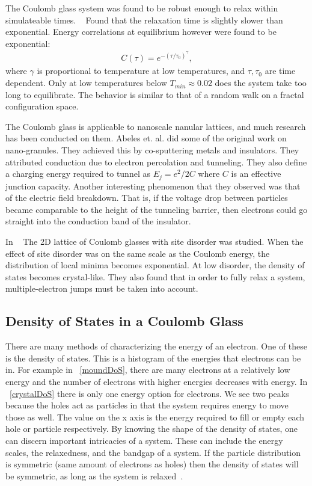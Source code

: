 The Coulomb glass system was found to be robust enough to relax within simulateable times. ~\cite{Kirkengen09} Found that the relaxation time is slightly slower than exponential. Energy correlations at equilibrium however were found to be exponential:
\begin{eqnarray}
C(\tau) = e^{-(\tau / \tau_0)^\gamma},
\label{correlations}
\end{eqnarray}
where $\gamma$ is proportional to temperature at low temperatures, and $\tau , \tau_0$ are time dependent. Only at low temperatures below $T_{min} \approx 0.02$ does the system take too long to equilibrate. The behavior is similar to that of a random walk on a fractal configuration space. 

The Coulomb glass is applicable to nanoscale nanular lattices, and much research has been conducted on them. Abeles et. al. did some of the original work on nano-granules. They achieved this by co-sputtering metals and insulators. They attributed conduction due to electron percolation and tunneling. They also define a charging energy required to tunnel as $E_j = e^2/2C$ where $C$ is an effective junction capacity. Another interesting phenomenon that they observed was that of the electric field breakdown. That is, if the voltage drop between particles became comparable to the height of the tunneling barrier, then electrons could go straight into the conduction band of the insulator. 

In ~\cite{Vinokur08} The 2D lattice of Coulomb glasses with site disorder was studied. When the effect of site disorder was on the same scale as the Coulomb energy, the distribution of local minima becomes exponential. At low disorder, the density of states becomes crystal-like. They also found that in order to fully relax a system, multiple-electron jumps must be taken into account. 

\subsection{Density of States in a Coulomb Glass}
There are many methods of characterizing the energy of an electron. One of these is the density of states. This is a histogram of the energies that electrons can be in. For example in ~\ref{moundDoS}, there are many electrons at a relatively low energy and the number of electrons with higher energies decreases with energy. In ~\ref{crystalDoS} there is only one energy option for electrons. We see two peaks because the holes act as particles in that the system requires energy to move those as well. The value on the x axis is the energy required to fill or empty each hole or particle respectively. By knowing the shape of the density of states, one can discern important intricacies of a system. These can include the energy scales, the relaxedness, and the bandgap of a system. If the particle distribution is symmetric (same amount of electrons as holes) then the density of states will be symmetric, as long as the system is relaxed~\cite{Kittel96}.

